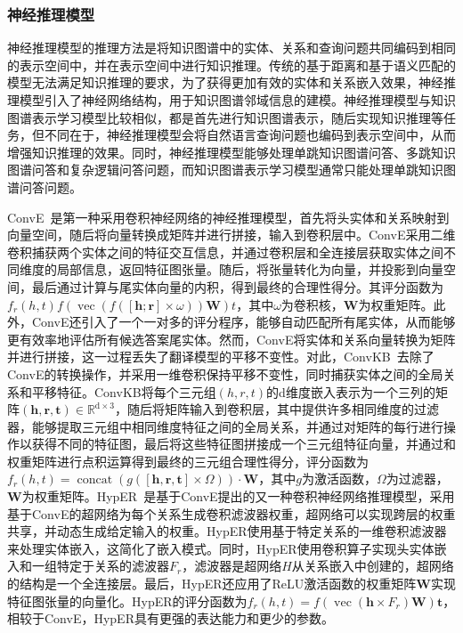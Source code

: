 \documentclass[algorithmlist, AutoFakeBold, AutoFakeSlant, figurelist, tablelist, nomlist, engineering]{seuthesix}
\begin{document}
\subsubsection{神经推理模型}
神经推理模型的推理方法是将知识图谱中的实体、关系和查询问题共同编码到相同的表示空间中，并在表示空间中进行知识推理。传统的基于距离和基于语义匹配的模型无法满足知识推理的要求，为了获得更加有效的实体和关系嵌入效果，神经推理模型引入了神经网络结构，用于知识图谱邻域信息的建模。神经推理模型与知识图谱表示学习模型比较相似，都是首先进行知识图谱表示，随后实现知识推理等任务，但不同在于，神经推理模型会将自然语言查询问题也编码到表示空间中，从而增强知识推理的效果。同时，神经推理模型能够处理单跳知识图谱问答、多跳知识图谱问答和复杂逻辑问答问题，而知识图谱表示学习模型通常只能处理单跳知识图谱问答问题。

ConvE~\cite{dettmers2018convolutional}是第一种采用卷积神经网络的神经推理模型，首先将头实体和关系映射到向量空间，随后将向量转换成矩阵并进行拼接，输入到卷积层中。ConvE采用二维卷积捕获两个实体之间的特征交互信息，并通过卷积层和全连接层获取实体之间不同维度的局部信息，返回特征图张量。随后，将张量转化为向量，并投影到向量空间，最后通过计算与尾实体向量的内积，得到最终的合理性得分。其评分函数为$f_r\left(h, t\right)f(\operatorname{vec}(f([\bm{h} ; \bm{r}] \times \omega)) \mathbf{W}) t$，其中$\omega$为卷积核，$\mathbf{W}$为权重矩阵。此外，ConvE还引入了一个一对多的评分程序，能够自动匹配所有尾实体，从而能够更有效率地评估所有候选答案尾实体。然而，ConvE将实体和关系向量转换为矩阵并进行拼接，这一过程丢失了翻译模型的平移不变性。对此，ConvKB~\cite{nguyen2018novel}去除了ConvE的转换操作，并采用一维卷积保持平移不变性，同时捕获实体之间的全局关系和平移特征。ConvKB将每个三元组$(h, r, t)$的d维度嵌入表示为一个三列的矩阵$(\bm{h}, \bm{r}, \bm{t}) \in \mathbb{R}^{\mathrm{d} \times 3}$，随后将矩阵输入到卷积层，其中提供许多相同维度的过滤器，能够提取三元组中相同维度特征之间的全局关系，并通过对矩阵的每行进行操作以获得不同的特征图，最后将这些特征图拼接成一个三元组特征向量，并通过和权重矩阵进行点积运算得到最终的三元组合理性得分，评分函数为$f_r(h, t)=\operatorname{concat}(g([\bm{h}, \bm{r}, \bm{t}] \times \Omega)) \cdot \mathbf{W}$，其中$g$为激活函数，$\Omega$为过滤器，$\mathbf{W}$为权重矩阵。HypER~\cite{balazevic2019hypernetwork}是基于ConvE提出的又一种卷积神经网络推理模型，采用基于ConvE的超网络为每个关系生成卷积滤波器权重，超网络可以实现跨层的权重共享，并动态生成给定输入的权重。HypER使用基于特定关系的一维卷积滤波器来处理实体嵌入，这简化了嵌入模式。同时，HypER使用卷积算子实现头实体嵌入和一组特定于关系的滤波器$F_r$，滤波器是超网络$H$从关系嵌入中创建的，超网络的结构是一个全连接层。最后，HypER还应用了ReLU激活函数的权重矩阵$\mathbf{W}$实现特征图张量的向量化。HypER的评分函数为$f_r(h, t)=f\left(\operatorname{vec}\left(\bm{h} \times F_r\right) \mathbf{W}\right) \bm{t}$，相较于ConvE，HypER具有更强的表达能力和更少的参数。
\end{document}
